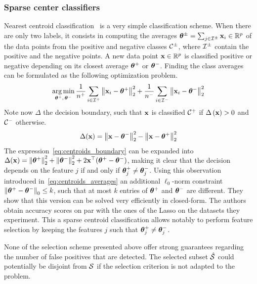 \subsubsection{Sparse center classifiers}

Nearest centroid classification~\citep{centroid_classification} is a very simple classification scheme.
When there are only two labels,
it consists in computing the averages $\bm{\theta}^\pm = \sum_{j \in \mathcal{I}^\pm} \mathbf{x}_i \in \mathbb{R}^p$
of the data points from the positive and negative classes $\mathcal{C}^\pm$,
where $\mathcal{I}^\pm$ contain the positive and the negative points.
A new data point $\mathbf{x} \in \mathbb{R}^p$ is classified positive or negative depending on its closest average
$\bm{\theta}^+$ or $\bm{\theta}^-$.
Finding the class averages can be formulated as the following optimization problem.
\begin{equation}\label{eq:centroids_averages}
    \operatorname*{arg\,min}_{\bm{\theta}^+,\, \bm{\theta}^-}
        \frac{1}{n^+} \sum_{i \in \mathcal{I}^+} \big\lVert \mathbf{x}_i - \bm{\theta}^+ \big\rVert^2_2
        + \frac{1}{n^-} \sum_{i \in \mathcal{I}^-} \big\lVert \mathbf{x}_i - \bm{\theta}^- \big\rVert^2_2
\end{equation}
Note now $\Delta$ the decision boundary,
such that $\mathbf{x}$ is classified $\mathcal{C}^+$ if $\Delta\left( \mathbf{x} \right) > 0$ and $\mathcal{C}^-$ otherwise.
\begin{equation}\label{eq:centroids_boundary}
    \Delta(\mathbf{x}) = \left\lVert\mathbf{x} - \bm{\theta}^-\right\rVert^2_2 - \left\lVert\mathbf{x} - \bm{\theta}^+\right\rVert^2_2
\end{equation}
The expression~\ref{eq:centroids_boundary} can be expanded into
$\Delta(\mathbf{x}) = \left\lVert\bm{\theta}^+\right\rVert^2_2 + \left\lVert\bm{\theta}^-\right\rVert^2_2 + 2\mathbf{x}^\top(\bm{\theta}^+ - \bm{\theta}^-)$,
making it clear that the decision depends on the feature $j$ if and only if $\bm{\theta}^+_j \neq \bm{\theta}^-_j$.
Using this observation~\cite{sparse_center_classifiers} introduced in~\ref{eq:centroids_averages}
an additional $\ell_0$-norm constraint $\left\lVert\bm{\theta}^+ - \bm{\theta}^-\right\rVert_0 \leq k$,
such that at most $k$ entries of $\bm{\theta}^+$ and $\bm{\theta}^-$ are different.
They show that this version can be solved very efficiently in closed-form.
The authors obtain accuracy scores on par with the ones of the Lasso on the datasets they experiment.
This a sparse centroid classification allows notably to perform feature selection
by keeping the features $j$ such that $\bm{\theta}^+_j \neq \bm{\theta}^-_j$.

\bigbreak
None of the selection scheme presented above offer strong guarantees regarding
the number of false positives that are detected.
The selected subset $\hat{\mathcal{S}}$ could potentially be disjoint from $\mathcal{S}$
if the selection criterion is not adapted to the problem.

